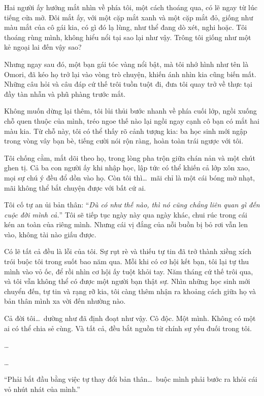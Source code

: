 \documentclass[../main.tex]{subfiles}
\begin{document}
Hai người ấy hướng mắt nhìn về phía tôi, một cách thoáng qua, có lẽ ngay từ lúc tiếng cửa mở. Đôi mắt ấy, với một cặp mắt xanh và một cặp mắt đỏ, giống như màu mắt của cô gái kia, có gì đó lạ lùng, như thể đang dò xét, nghi hoặc. Tôi thoáng rùng mình, không hiểu nổi tại sao lại như vậy. Trông tôi giống như một kẻ ngoại lai đến vậy sao?

Nhưng ngay sau đó, một bạn gái tóc vàng nổi bật, mà tôi nhớ hình như tên là Omori, đã kéo họ trở lại vào vòng trò chuyện, khiến ánh nhìn kia cũng biến mất. Những câu hỏi và câu đáp cứ thế trôi tuồn tuột đi, đưa tôi quay trở về thực tại đầy tàn nhẫn và phũ phàng trước mắt.

Không muốn dừng lại thêm, tôi lủi thủi bước nhanh về phía cuối lớp, ngồi xuống chỗ quen thuộc của mình, tréo ngoe thế nào lại ngồi ngay cạnh cô bạn có mắt hai màu kia. Từ chỗ này, tôi có thể thấy rõ cảnh tượng kia: ba học sinh mới ngập trong vòng vây bạn bè, tiếng cười nói rộn ràng, hoàn toàn trái ngược với tôi.


Tôi chống cằm, mắt dõi theo họ, trong lòng pha trộn giữa chán nản và một chút ghen tị. Cả ba con người ấy khi nhập học, lập tức có thể khiến cả lớp xôn xao, mọi sự chú ý đều đổ dồn vào họ. Còn tôi thì\dots\ mãi chỉ là một cái bóng mờ nhạt, mãi không thể bắt chuyện được với bất cứ ai.

Tôi cố tự an ủi bản thân: ``\textit{Dù có như thế nào, thì nó cũng chẳng liên quan gì đến cuộc đời mình cả.}'' Tôi sẽ tiếp tục ngày này qua ngày khác, chui rúc trong cái kén an toàn của riêng mình. Nhưng cái vị đắng của nỗi buồn bị bỏ rơi vẫn len vào, không tài nào giấu được.

Có lẽ tất cả đều là lỗi của tôi. Sự rụt rè và thiếu tự tin đã trở thành xiềng xích trói buộc tôi trong suốt bao năm qua. Mỗi khi có cơ hội kết bạn, tôi lại tự thu mình vào vỏ ốc, để rồi nhìn cơ hội ấy tuột khỏi tay. Năm tháng cứ thế trôi qua, và tôi vẫn không thể có được một người bạn thật sự. Nhìn những học sinh mới chuyển đến, tự tin và rạng rỡ kia, tôi càng thêm nhận ra khoảng cách giữa họ và bản thân mình xa vời đến nhường nào.

Cả đời tôi\dots\ dường như đã định đoạt như vậy. Cô độc. Một mình. Không có một ai có thể chia sẻ cùng. Và tất cả, đều bắt nguồn từ chính sự yếu đuối trong tôi.

\dots

\dots

``Phải bắt đầu bằng việc tự thay đổi bản thân\dots\ buộc mình phải bước ra khỏi cái vỏ nhút nhát của mình.''
\end{document}

